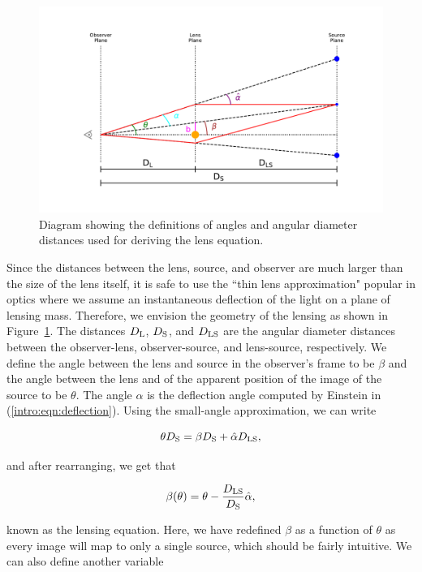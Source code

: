 \begin{figure}
\includegraphics[width=\textwidth, trim=75pt 75pt 75pt 75pt]{Intro/lens_diagram.pdf}
\caption[Diagram of gravitational lensing parameters]{Diagram showing the definitions of angles and angular diameter distances used for deriving the lens equation.}
\label{intro:fig:diagram}
\end{figure}

Since the distances between the lens, source, and observer are much larger than the size of the lens itself, it is safe to use the ``thin lens approximation" popular in optics where we assume an instantaneous deflection of the light on a plane of lensing mass. Therefore, we envision the geometry of the lensing as shown in Figure~\ref{intro:fig:diagram}. The distances $D_\mathrm{L}$, $D_\mathrm{S}$, and $D_\mathrm{LS}$ are the angular diameter distances between the observer-lens, observer-source, and lens-source, respectively. We define the angle between the lens and source in the observer's frame to be $\beta$ and the angle between the lens and of the apparent position of the image of the source to be $\theta$. The angle $\hat\alpha$ is the deflection angle computed by Einstein in (\ref{intro:eqn:deflection}). Using the small-angle approximation, we can write

\begin{equation}
\theta D_\mathrm{S} = \beta D_\mathrm{S} + \hat\alpha D_\mathrm{LS},
\end{equation}

\noindent and after rearranging, we get that

\begin{equation}
\beta(\theta) = \theta - \frac{D_\mathrm{LS}}{D_\mathrm{S}} \hat\alpha,
\end{equation}

\noindent known as the lensing equation. Here, we have redefined $\beta$ as a function of $\theta$ as every image will map to only a single source, which should be fairly intuitive. We can also define another variable

